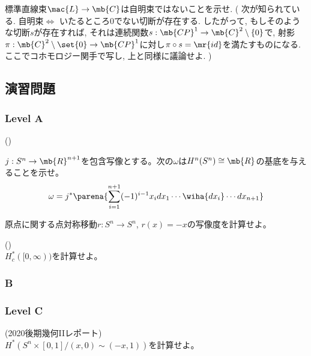 \begin{prac}
標準直線束$\mac{L}\to \mb{C}$は自明束ではないことを示せ. ( 次が知られている. 自明束$\iff$ いたるところ0でない切断が存在する. したがって, もしそのような切断$s$が存在すれば, それは連続関数$s: \mb{CP}^1\to \mb{C}^2\setminus{\{ 0 \}}$で, 射影$\pi:\mb{C}^2 \setminus{\set{0}} \to \mb{CP}^1$に対し$\pi\circ s = \mr{id}$を満たすものになる. ここでコホモロジー関手で写し, 上と同様に議論せよ. )
\end{prac}


\subsection{演習問題}
\subsubsection{Level A}
\begin{prob} ()\\
\ben
\item $j:S^n\to \mb{R}^{n+1}$を包含写像とする。次の$\omega$は$H^{n}(S^n)\cong \mb{R}$の基底を与えることを示せ。
\[\omega = j^{\ast}\parena{\sum_{i=1}^{n+1} (-1)^{i-1}x_i dx_1\cdots \wiha{dx_{i}}\cdots dx_{n+1}}\]
\item 原点に関する点対称移動$r:S^n\to S^n$, $r(x)=-x$の写像度を計算せよ。
\een
\end{prob}

\begin{prob} ()\\
$H_{c}^{\ast}([0,\infty))$を計算せよ。
\end{prob}

\subsubsection{B}


\subsubsection{Level C}
\begin{prob} (2020後期幾何IIレポート)\\
$H^{\ast}(S^n\times [0,1] / (x,0)\sim (-x,1))$を計算せよ。
\end{prob}

